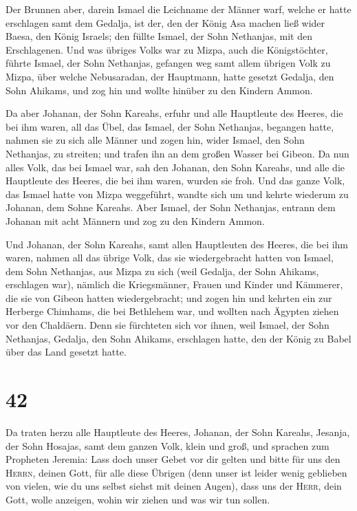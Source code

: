  Der Brunnen aber, darein Ismael die Leichname der Männer
warf, welche er hatte erschlagen samt dem Gedalja, ist der, den der
König Asa machen ließ wider Baesa, den König Israels; den füllte Ismael,
der Sohn Nethanjas, mit den Erschlagenen.  Und was
übriges Volks war zu Mizpa, auch die Königstöchter, führte Ismael, der
Sohn Nethanjas, gefangen weg samt allem übrigen Volk zu Mizpa, über
welche Nebusaradan, der Hauptmann, hatte gesetzt Gedalja, den Sohn
Ahikams, und zog hin und wollte hinüber zu den Kindern Ammon.

 Da aber Johanan, der Sohn Kareahs, erfuhr und alle
Hauptleute des Heeres, die bei ihm waren, all das Übel, das Ismael, der
Sohn Nethanjas, begangen hatte,  nahmen sie zu sich alle
Männer und zogen hin, wider Ismael, den Sohn Nethanjas, zu streiten; und
trafen ihn an dem großen Wasser bei Gibeon.  Da nun alles
Volk, das bei Ismael war, sah den Johanan, den Sohn Kareahs, und alle
die Hauptleute des Heeres, die bei ihm waren, wurden sie froh.
 Und das ganze Volk, das Ismael hatte von Mizpa
weggeführt, wandte sich um und kehrte wiederum zu Johanan, dem Sohne
Kareahs.  Aber Ismael, der Sohn Nethanjas, entrann dem
Johanan mit acht Männern und zog zu den Kindern Ammon.

 Und Johanan, der Sohn Kareahs, samt allen Hauptleuten
des Heeres, die bei ihm waren, nahmen all das übrige Volk, das sie
wiedergebracht hatten von Ismael, dem Sohn Nethanjas, aus Mizpa zu sich
(weil Gedalja, der Sohn Ahikams, erschlagen war), nämlich die
Kriegsmänner, Frauen und Kinder und Kämmerer, die sie von Gibeon hatten
wiedergebracht;  und zogen hin und kehrten ein zur
Herberge Chimhams, die bei Bethlehem war, und wollten nach Ägypten
ziehen vor den Chaldäern.  Denn sie fürchteten sich vor
ihnen, weil Ismael, der Sohn Nethanjas, Gedalja, den Sohn Ahikams,
erschlagen hatte, den der König zu Babel über das Land gesetzt hatte.

\hypertarget{section-41}{%
\section{42}\label{section-41}}

 Da traten herzu alle Hauptleute des Heeres, Johanan, der
Sohn Kareahs, Jesanja, der Sohn Hosajas, samt dem ganzen Volk, klein und
groß,  und sprachen zum Propheten Jeremia: Lass doch unser
Gebet vor dir gelten und bitte für uns den \textsc{Herrn}, deinen Gott,
für alle diese Übrigen (denn unser ist leider wenig geblieben von
vielen, wie du uns selbst siehst mit deinen Augen),  dass
uns der \textsc{Herr}, dein Gott, wolle anzeigen, wohin wir ziehen und
was wir tun sollen.

